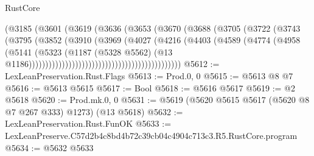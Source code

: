 \begin{lexlean}{RustCore}
\begin{coremodule}
                                                (@3185
                                                  (@3601
                                                    (@3619
                                                      (@3636
                                                        (@3653
                                                          (@3670
                                                            (@3688
                                                              (@3705
                                                                (@3722
                                                                  (@3743
                                                                    (@3795
                                                                      (@3852
                                                                        (@3910
                                                                          (@3969
                                                                            (@4027
                                                                              (@4216
                                                                                (@4403
                                                                                  (@4589
                                                                                    (@4774
                                                                                      (@4958
                                                                                        (@5141
                                                                                          (@5323
                                                                                            (@1187
                                                                                              (@5328
                                                                                                @5562)
                                                                                              (@13
                                                                                                @1186))))))))))))))))))))))))))))))))))))))))))))))
@5612 := LexLeanPreservation.Rust.Flags
@5613 := Prod.{0, 0}
@5615 := @5613 @8 @7
@5616 := @5613 @5615
@5617 := Bool
@5618 := @5616 @5617
@5619 := @2 @5618
@5620 := Prod.mk.{0, 0}
@5631 := @5619 (@5620 @5615 @5617 (@5620 @8 @7 @267 @333) @1273) (@13 @5618)
@5632 := LexLeanPreservation.Rust.FunOK
@5633 := LexLeanPreserve.C57d2b4c8bd4b72c39cb04c4904c713c3.R5.RustCore.program
@5634 := @5632 @5633

\end{coremodule}
\end{lexlean}
